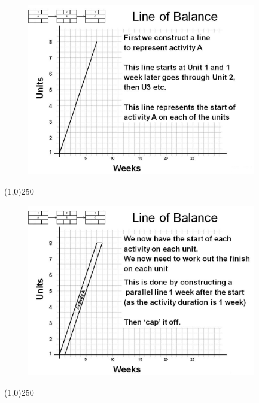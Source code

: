 \begin{frame}
\begin{figure}
	\centering
		\includegraphics[width = 10.0cm]{oldnotes/Slide244.jpg}
\end{figure}
\end{frame}
\begin{center}\line(1,0){250}\end{center}






\begin{frame}
\begin{figure}
	\centering
		\includegraphics[width = 10.0cm]{oldnotes/Slide245.jpg}
\end{figure}
\end{frame}
\begin{center}\line(1,0){250}\end{center}






